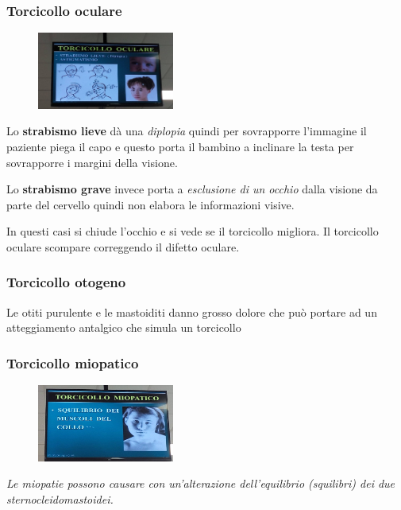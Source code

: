 \subsubsection{Torcicollo oculare}

\begin{figure}[!ht]
\centering
\includegraphics[width=0.4\textwidth]{013/image34.jpeg}
\end{figure}

Lo \textbf{strabismo lieve} dà una \emph{diplopia} quindi per sovrapporre l'immagine il paziente piega il capo e questo porta il bambino a inclinare la testa per sovrapporre i margini della visione.

Lo \textbf{strabismo grave} invece porta a \emph{esclusione di un occhio} dalla visione da parte del cervello quindi non elabora le informazioni visive.

In questi casi si chiude l'occhio e si vede se il torcicollo migliora.
Il torcicollo oculare scompare correggendo il difetto oculare.

\subsubsection{Torcicollo otogeno}

Le otiti purulente e le mastoiditi danno grosso dolore che può portare ad un atteggiamento antalgico che simula un torcicollo

\subsubsection{Torcicollo miopatico}

\begin{figure}[!ht]
\centering
\includegraphics[width=0.4\textwidth]{013/image35.jpeg}
\end{figure}

\emph{Le miopatie possono causare con un'alterazione dell'equilibrio (squilibri) dei due sternocleidomastoidei.}
